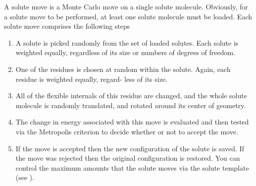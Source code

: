 \documentclass[letterpaper,10pt,english]{sphinxmanual}
\begin{document}
\ignorespaces 
{}
A solute move is a Monte Carlo move on a single solute molecule. Obviously, for a solute move to be performed, at least one solute molecule must be loaded. Each solute move comprises the following steps
\begin{enumerate}
\item {} 
A solute is picked randomly from the set of loaded solutes. Each solute is weighted equally, regardless of its size or numbers of degrees of freedom.

\item {} 
One of the residues is chosen at random within the solute. Again, each residue is weighted equally, regard- less of its size.

\item {} 
All of the flexible internals of this residue are changed, and the whole solute molecule is randomly translated, and rotated around its center of geometry.

\item {} 
The change in energy associated with this move is evaluated and then tested via the Metropolis criterion to decide whether or not to accept the move.

\item {} 
If the move is accepted then the new configuration of the solute is saved. If the move was rejected then the original configuration is restored. You can control the maximum amounts that the solute moves via the solute template (see {\hyperref[\detokenize{protoms:temref}]{}}).

\end{enumerate}

\ignorespaces 
{}
\end{document}
